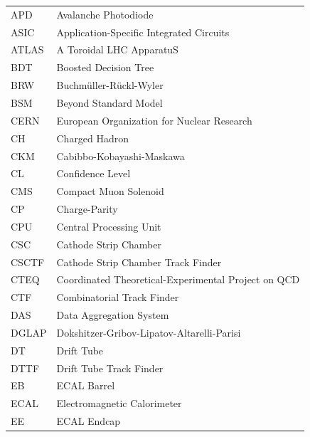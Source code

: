 \documentclass[12pt]{thesis}  %
\begin{document}
\begin{longtable}[l]{@{}l@{\ \ \ \ \ \ \ \ \ \ \ \ }l}
APD        & Avalanche Photodiode \\
ASIC       & Application-Specific Integrated Circuits \\
ATLAS      & A Toroidal LHC ApparatuS \\
BDT        & Boosted Decision Tree \\
BRW        & Buchm\"{u}ller-R\"{u}ckl-Wyler \\
BSM        & Beyond Standard Model \\
CERN       & European Organization for Nuclear Research \\
CH         & Charged Hadron \\
CKM        & Cabibbo-Kobayashi-Maskawa \\
CL         & Confidence Level \\
CMS        & Compact Muon Solenoid \\
CP         & Charge-Parity \\
CPU        & Central Processing Unit \\
CSC        & Cathode Strip Chamber \\
CSCTF      & Cathode Strip Chamber Track Finder \\
CTEQ       & Coordinated Theoretical-Experimental Project on QCD \\
CTF        & Combinatorial Track Finder \\
DAS        & Data Aggregation System \\
DGLAP      & Dokshitzer-Gribov-Lipatov-Altarelli-Parisi \\
DT         & Drift Tube \\
DTTF       & Drift Tube Track Finder \\
EB         & ECAL Barrel \\
ECAL       & Electromagnetic Calorimeter \\
EE         & ECAL Endcap \\

\end{longtable}
\end{document}
